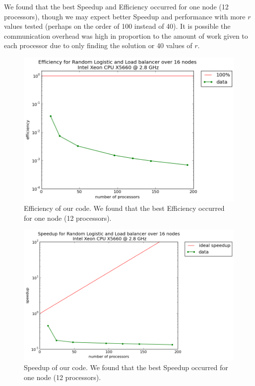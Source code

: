 \documentclass[12pt]{article}
\begin{document}
We found that the best Speedup and Efficiency occurred for one node
(12 processors), though we may expect better Speedup and performance
with more $r$ values tested (perhaps on the order of 100 instead of 40). It is possible the communication overhead was high in proportion to the amount of work given to each processor due to only finding the solution or 40 values of $r$.
\begin{figure}[H]
	\begin{center}
		\includegraphics[scale=0.5]{efficiency_random_logistic}
\caption{Efficiency of our code. We found that the best Efficiency occurred for one node
(12 processors).}
	\end{center}
\end{figure}
\begin{figure}[H]
	\begin{center}
		\includegraphics[scale=0.5]{speedup_random_logistic}
\caption{Speedup of our code. We found that the best Speedup occurred for one node
(12 processors).}\label{speedup}
	\end{center}
\end{figure}
\end{document}
